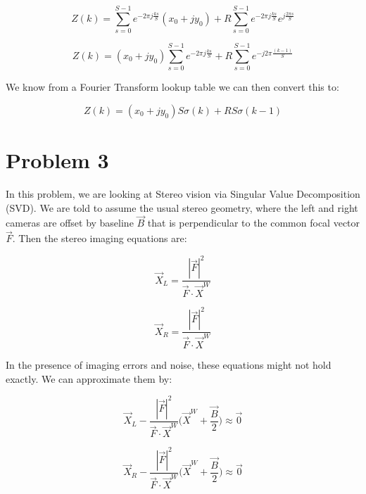 \documentclass{article}
\begin{document}
\begin{equation}
    Z(k) = \sum^{S-1}_{s=0} e^{-2\pi j \frac{ks}{S}} (x_0 + jy_0) + R\sum^{S-1}_{s=0} e^{-2\pi j \frac{ks}{S}} e^{j\frac{2\pi s}{S}}
\end{equation}

\begin{equation}
    Z(k) = (x_0 + jy_0) \sum^{S-1}_{s=0} e^{-2\pi j \frac{ks}{S}}  + R\sum^{S-1}_{s=0} e^{-j 2 \pi \frac{(k-1)}{S}}
\end{equation}

\noindent We know from a Fourier Transform lookup table we can then convert this to:

\begin{equation}
    Z(k) = (x_0+jy_0)S\sigma(k) + RS\sigma(k-1)
\end{equation}



\section*{Problem 3}

In this problem, we are looking at Stereo vision via Singular Value Decomposition (SVD). We are told to assume the usual stereo geometry, where the left and right cameras are offset by baseline $\vec{B}$ that is perpendicular to the common focal vector $\vec{F}$. Then the stereo imaging equations are:

\begin{equation}
    \vec{X}_L = \frac{|\vec{F}|^2}{\vec{F}\cdot \vec{X}^W}
\end{equation}

\begin{equation}
    \vec{X}_R = \frac{|\vec{F}|^2}{\vec{F}\cdot \vec{X}^W}
\end{equation}

\noindent In the presence of imaging errors and noise, these equations might not hold exactly. We can approximate them by:

\begin{equation}
    \vec{X}_L-\frac{|\vec{F}|^2}{\vec{F} \cdot \vec{X}^W}
    \bigl(
        \vec{X}^W + \frac{\vec{B}}{2}
    \bigr) \approx \vec{0}
\end{equation}

\begin{equation}
    \vec{X}_R-\frac{|\vec{F}|^2}{\vec{F} \cdot \vec{X}^W}
    \bigl(
        \vec{X}^W + \frac{\vec{B}}{2}
    \bigr) \approx \vec{0}
\end{equation}
\end{document}
